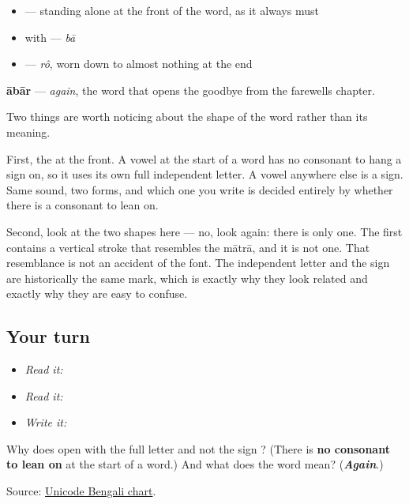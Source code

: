 \begin{itemize}
\raggedright
  \item \textbf{} — standing alone at the front of the word, as it always must
  \item \textbf{} with \textbf{} — \emph{bā}
  \item \textbf{} — \emph{rô}, worn down to almost nothing at the end
\end{itemize}

\textbf{ābār} — \emph{again}, the word that opens the goodbye from the farewells chapter.

Two things are worth noticing about the shape of the word rather than its meaning.

First, the \textbf{} at the front. A vowel at the start of a word has no consonant to hang a sign on, so it uses its own full independent letter. A vowel anywhere else is a sign. Same sound, two forms, and which one you write is decided entirely by whether there is a consonant to lean on.

Second, look at the two \textbf{} shapes here — no, look again: there is only one. The first \textbf{} contains a vertical stroke that resembles the mātrā, and it is not one. That resemblance is not an accident of the font. The independent letter and the sign are historically the same mark, which is exactly why they look related and exactly why they are easy to confuse.

\subsection*{Your turn}
\begin{itemize}
\raggedright
  \item \emph{Read it:} 
  \item \emph{Read it:}  
  \item \emph{Write it:} 
\end{itemize}

\begin{tcolorbox}[breakable,colback=teal!4,colframe=teal!35!black,title={Before you move on}]
Why does \textbf{} open with the full letter \textbf{} and not the sign \textbf{}? (There is \textbf{no consonant to lean on} at the start of a word.) And what does the word mean? (\emph{\textbf{Again}}.)

Source: \href{https://www.unicode.org/charts/PDF/U0980.pdf}{Unicode Bengali chart}.
\end{tcolorbox}

